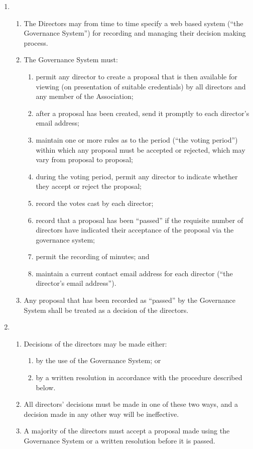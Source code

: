 \begin{enumerate}
\item
  \begin{enumerate}
    \item
    The Directors may from time to time specify a web based system (``the
    Governance System'') for recording and managing their decision making process.
    \item
    The Governance System must:
        \begin{enumerate}
            \item
             permit any director to create a proposal that is then available for viewing (on
             presentation of suitable credentials) by all directors and any member of the
             Association;
            \item
            after a proposal has been created, send it promptly to each director's email address;
            \item
             maintain one or more rules as to the period (``the voting period'') within which any
             proposal must be accepted or rejected, which may vary from proposal to proposal;
            \item
             during the voting period, permit any director to indicate whether they accept or reject
             the proposal;
            \item
             record the votes cast by each director;
            \item
             record that a proposal has been ``passed'' if the requisite number of directors have
             indicated their acceptance of the proposal via the governance system;
            \item
             permit the recording of minutes; and
            \item
             maintain a current contact email address for each director (``the director's email
             address'').
        \end{enumerate}
    \item
    Any proposal that has been recorded as ``passed'' by the Governance System shall
    be treated as a decision of the directors.
  \end{enumerate}

\item
  \begin{enumerate}
    \item
    Decisions of the directors may be made either:
    \begin{enumerate}
        \item
        by the use of the Governance System; or
        \item
        by a written resolution in accordance with the procedure described below.
    \end{enumerate}
    \item
    All directors' decisions must be made in one of these two ways, and a decision
    made in any other way will be ineffective.
    \item
    A majority of the directors must accept a proposal made using the
    Governance System or a written resolution before it is passed.
  \end{enumerate}


\end{enumerate}
